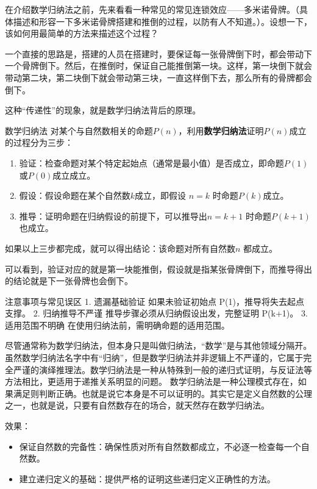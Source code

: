 在介绍数学归纳法之前，先来看看一种常见的常见连锁效应——多米诺骨牌。（具体描述和形容一下多米诺骨牌搭建和推倒的过程，以防有人不知道。）。设想一下，该如何用最简单的方法来描述这个过程？

一个直接的思路是，搭建的人员在搭建时，要保证每一张骨牌倒下时，都会带动下一个骨牌倒下。然后，在推倒时，保证自己能推倒第一块。这样，第一块倒下就会带动第二块，第二块倒下就会带动第三块，一直这样倒下去，那么所有的骨牌都会倒下。

这种“传递性”的现象，就是数学归纳法背后的原理。

\begin{definition}{数学归纳法}
对某个与自然数相关的命题$P(n)$，利用\textbf{数学归纳法}证明$P(n)$成立的过程分为三步：
\begin{enumerate}
\item 验证：检查命题对某个特定起始点（通常是最小值）是否成立，即命题$P(1)$或$P(0)$成立成立。
\item 假设：假设命题在某个自然数$k$成立，即假设 $n = k$ 时命题$P(k)$成立。
\item 推导：证明命题在归纳假设的前提下，可以推导出$n = k+1$ 时命题$P(k+1)$也成立。
\end{enumerate}
如果以上三步都完成，就可以得出结论：该命题对所有自然数$n$ 都成立。
\end{definition}

可以看到，验证对应的就是第一块能推倒，假设就是指某张骨牌倒下，而推导得出的结论就是下一张骨牌也会倒下。

注意事项与常见误区
	1.	遗漏基础验证
如果未验证初始点 P(1)，推导将失去起点支撑。
	2.	归纳推导不严谨
推导步骤必须从归纳假设出发，完整证明 P(k+1)。
	3.	适用范围不明确
在使用归纳法前，需明确命题的适用范围。

尽管通常称为数学归纳法，但本身只是叫做归纳法，“数学”是与其他领域分隔开。虽然数学归纳法名字中有“归纳”，但是数学归纳法并非逻辑上不严谨的，它属于完全严谨的演绎推理法。数学归纳法是一种从特殊到一般的递归式证明，与反证法等方法相比，更适用于递推关系明显的问题。
数学归纳法是一种公理模式存在，如果满足则判断正确。也就是说它本身是不可以证明的。其实它是定义自然数的公理之一，也就是说，只要有自然数存在的场合，就天然存在数学归纳法。

效果：
\begin{itemize}
\item 保证自然数的完备性：确保性质对所有自然数都成立，不必逐一检查每一个自然数。
\item 建立递归定义的基础：提供严格的证明这些递归定义正确性的方法。
\end{itemize}
